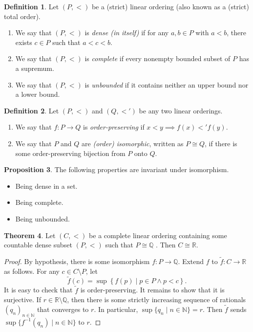 \documentclass[10pt,letterpaper,cm]{nupset}
\theoremstyle{definition}
\newtheorem{definition}{Definition}[subsection]
\theoremstyle{theorem}
\newtheorem{theorem}[definition]{Theorem}
\newtheorem{prop}[definition]{Proposition}
\theoremstyle{remark}
\newcommand{\N}{\mathbb N}
\newcommand{\Q}{\mathbb Q}
\newcommand{\R}{\mathbb R}
\newcommand{\1}{\mathbf{1}}
\newcommand{\0}{\vec 0}
\begin{document}
\begin{definition} Let  $\left(P, <\right)$ be a (strict) linear ordering (also known as a (strict) total order).
\begin{enumerate}
\item We say that $\left(P, <\right)$  is \textit{dense (in itself)} if for any $a, b \in P$ with $a<b$, there exists   $c\in P$ such that $a<c<b$. 
\item We say that $\left(P, <\right)$ is \textit{complete} if every nonempty bounded subset of $P$ has a supremum. 
\item We say that $\left(P, <\right)$ is \textit{unbounded} if it contains neither an upper bound nor a lower bound. 
\end{enumerate}
\end{definition}

\begin{definition}
Let $\left(P, <\right)$ and $\left(Q, <'\right)$ be any two linear orderings. 
\begin{enumerate}
\item We say that $f : P \to Q$ is \textit{order-preserving} if $x< y \implies f(x) <' f(y)$.
\item We say that $P$ and $Q$ are \textit{(order) isomorphic}, written as $P\cong Q$, if there is some order-preserving bijection from $P$ onto $Q$.
\end{enumerate}
\end{definition}

\begin{prop}
The following  properties are invariant under isomorphism.
\begin{itemize}
\item Being dense in a set.
\item Being complete.
\item Being unbounded. 
\end{itemize}
\end{prop}

\begin{theorem}
 Let $\left(C, <\right)$ be a complete linear ordering  containing some countable dense subset $\left(P, <\right)$ such that $P \cong \Q$ . Then $C\cong \R$. 
\end{theorem}
\begin{proof} 
 By hypothesis, there is some isomorphism $f: P \to \Q$. Extend $f$ to $\tilde{f} : C \to \R$ as follows. For any $c \in C \setminus P$, let $$\tilde{f}(c)  = \sup\left\{f(p) \mid p\in P \land p < c\right\}.$$ It is easy to check that $\tilde{f}$ is order-preserving. It remains to show that it is surjective. If $r\in \R \setminus \Q$, then there is some strictly increasing sequence of rationals $\left(q_n\right)_{n\in \N}$ that converges to $r$. In particular, $\sup\{q_n \mid n\in \N\}  = r$. Then $\tilde{f}$ sends $\sup\{f^{-1}(q_n) \mid n \in \N\}$ to $r$.
\end{proof}
\end{document}
